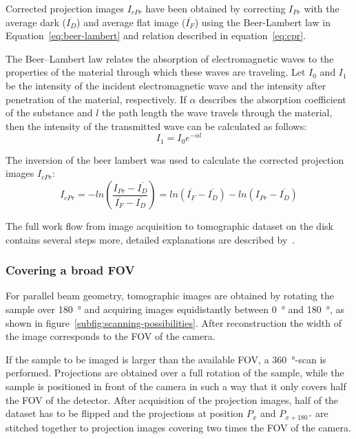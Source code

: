 Corrected projection images $I_{cPr}$ have been obtained by correcting $I_{Pr}$ with the average dark ($\overline{I_{D}}$) and average flat image ($\overline{I_{F}}$) using the Beer-Lambert law in Equation~\ref{eq:beer-lambert} and relation described in equation~\ref{eq:cpr}.

The Beer--Lambert law relates the absorption of electromagnetic waves to the properties of the material through which these waves are traveling. Let $I_{0}$ and $I_{1}$ be the intensity of the incident electromagnetic wave and the intensity after penetration of the material, respectively. If $\alpha$ describes the absorption coefficient of the substance and $l$ the path length the wave travels through the material, then the intensity of the transmitted wave can be calculated as follows:
\begin{equation}
	I_{1}=I_{0}e^{-\alpha l}
\label{eq:beer-lambert}
\end{equation}

The inversion of the beer lambert was used to calculate the corrected projection images $I_{cPr}$:
\begin{equation}
	I_{cPr} = -ln\left(\frac{I_{Pr}-\overline{I_{D}}}{\overline{I_{F}}-\overline{I_{D}}}\right)
	= ln(\overline{I_{F}}-\overline{I_{D}})-ln(I_{Pr}-\overline{I_{D}})
	\label{eq:cpr}
\end{equation}
\cbend

The full work flow from image acquisition to tomographic dataset on the disk contains several steps more, detailed explanations are described by~\citet{Hintermueller2009}.

\subsubsection{Covering a broad FOV}
\label{subsec:covering a broad fov}
For parallel beam geometry, tomographic images are obtained by rotating the sample over \SI{180}{\degree} and acquiring images equidistantly between \SI{0}{\degree} and \SI{180}{\degree}, as shown in figure~\ref{subfig:scanning-possibilities}. After reconstruction the width of the image corresponds to the FOV of the camera.

If the sample to be imaged is larger than the available FOV, a \SI{360}{\degree}-scan is performed. Projections are obtained over a full rotation of the sample, while the sample is positioned in front of the camera in such a way that it only covers half the FOV of the detector. After acquisition of the projection images, half of the dataset has to be flipped and the projections at position $P_{x}$ and $P_{x+\SI{180}{\degree}}$ are stitched together to projection images covering two times the FOV of the camera.

